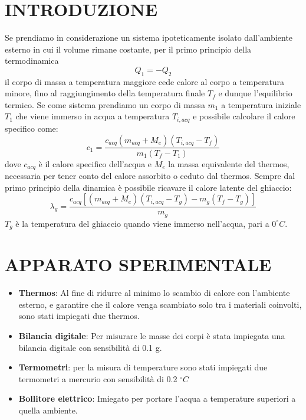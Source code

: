 \documentclass{article_saj}
\begin{document}
\section{INTRODUZIONE}
Se prendiamo in considerazione un sistema ipoteticamente isolato dall'ambiente esterno
in cui il volume rimane costante, per il primo principio della termodinamica 
\begin{equation}
     Q_1 = -Q_2
     \label{eq:1}
\end{equation}
il corpo di massa a temperatura maggiore cede calore al corpo a temperatura minore, fino al raggiungimento
della temperatura finale $T_f$ e dunque l'equilibrio termico. Se come sistema prendiamo un corpo
di massa $m_1$ a temperatura iniziale $T_1$ che viene immerso in acqua a temperatura $T_{i,acq}$
e possibile calcolare il calore specifico come:
\begin{equation}
     c_1 = \frac{c_{acq}(m_{acq} + M_e)(T_{i,acq} - T_f)}{m_1(T_f - T_1)}
     \label{eq:2}
\end{equation}
dove $c_{acq}$ è il calore specifico dell'acqua e $M_e$ la massa equivalente
del thermos, necessaria per tener conto del calore assorbito o ceduto dal thermos.
Sempre dal primo principio della dinamica è possibile ricavare il calore latente del ghiaccio:
\begin{equation}
     \lambda_g = \frac{c_{acq}[(m_{acq} + M_e)(T_{i,acq} - T_g) - m_g(T_f - T_g) ]}{m_g}
     \label{eq:3}
\end{equation}
$T_g$ è la temperatura del ghiaccio quando viene immerso nell'acqua, pari a $0^\circ C$.



\indent






\section{APPARATO SPERIMENTALE}
\begin{itemize}
     \item \textbf{Thermos}:
          Al fine di ridurre al minimo lo scambio di 
          calore con l'ambiente esterno, e garantire che il calore venga scambiato
          solo tra i materiali coinvolti, sono stati impiegati due thermos.
     \item \textbf{Bilancia digitale}:
          Per misurare le masse dei corpi è stata impiegata una bilancia 
          digitale con sensibilità di 0.1 g.
     \item \textbf{Termometri}:
          per la misura di temperature sono stati impiegati due
          termometri a mercurio con sensibilità di 0.2 $^\circ C$
     \item \textbf{Bollitore elettrico}:
          Imiegato per portare l'acqua a temperature superiori
          a quella ambiente.
 \end{itemize}
\indent
\end{document}

